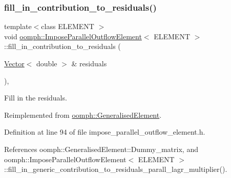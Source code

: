 \subsubsection{\texorpdfstring{fill\+\_\+in\+\_\+contribution\+\_\+to\+\_\+residuals()}{fill\_in\_contribution\_to\_residuals()}}
{\footnotesize\ttfamily template$<$class E\+L\+E\+M\+E\+NT $>$ \\
void \hyperlink{classoomph_1_1ImposeParallelOutflowElement}{oomph\+::\+Impose\+Parallel\+Outflow\+Element}$<$ E\+L\+E\+M\+E\+NT $>$\+::fill\+\_\+in\+\_\+contribution\+\_\+to\+\_\+residuals (\begin{DoxyParamCaption}\item[{\hyperlink{classoomph_1_1Vector}{Vector}$<$ double $>$ \&}]{residuals }\end{DoxyParamCaption})\hspace{0.3cm}{\ttfamily [inline]}, {\ttfamily [virtual]}}



Fill in the residuals. 



Reimplemented from \hyperlink{classoomph_1_1GeneralisedElement_a310c97f515e8504a48179c0e72c550d7}{oomph\+::\+Generalised\+Element}.



Definition at line 94 of file impose\+\_\+parallel\+\_\+outflow\+\_\+element.\+h.



References oomph\+::\+Generalised\+Element\+::\+Dummy\+\_\+matrix, and oomph\+::\+Impose\+Parallel\+Outflow\+Element$<$ E\+L\+E\+M\+E\+N\+T $>$\+::fill\+\_\+in\+\_\+generic\+\_\+contribution\+\_\+to\+\_\+residuals\+\_\+parall\+\_\+lagr\+\_\+multiplier().

\mbox{\label{classoomph_1_1ImposeParallelOutflowElement_a34414fec7ca51f720ac5a0a548cd9ef2}} 
